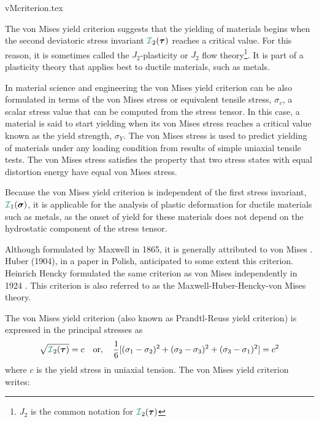 \begin{flushright} {\tiny {\color{gray} vMcriterion.tex}} \end{flushright}

The von Mises yield criterion suggests that the yielding of materials begins when the second 
deviatoric stress invariant ${\III}_2({\bm \tau})$ reaches a critical value. 
For this reason, it is sometimes called the $J_2$-plasticity or $J_2$ flow 
theory\footnote{$J_2$ is the common notation for ${\III}_2({\bm \tau})$}. 
It is part of a plasticity theory that applies best to ductile materials, such as metals. 

In material science and engineering the von Mises yield criterion can be also formulated in terms of 
the von Mises stress or equivalent tensile stress, $\sigma_v$, a scalar stress value that can be computed 
from the stress tensor. In this case, a material is said to start yielding when its von Mises stress 
reaches a critical value known as the yield strength, $\sigma_Y$. The von Mises stress is used to predict 
yielding of materials under any loading condition from results of simple uniaxial tensile tests. The 
von Mises stress satisfies the property that two stress states with equal distortion energy have equal 
von Mises stress. 

Because the von Mises yield criterion is independent of the first stress 
invariant, ${\III}_1({\bm \sigma})$, it is applicable 
for the analysis of plastic deformation for ductile materials such as metals, as the 
onset of yield for these materials does not depend on the hydrostatic component of the stress tensor. 

Although formulated by Maxwell in 1865, it is generally attributed to von Mises \cite{vonm13}. 
Huber (1904), in a paper in Polish, anticipated to some extent this criterion. 
Heinrich Hencky formulated the same criterion as von Mises independently in 1924 \cite{henc24,tata03}.
This criterion is also referred to as the Maxwell-Huber-Hencky-von Mises theory. 

The von Mises yield criterion (also known as Prandtl-Reuss yield criterion) 
is expressed in the principal stresses as
\[
\sqrt{{\III}_2({\bm \tau})} = c \quad \text{or}, \quad 
\frac{1}{6}[(\sigma_1 - \sigma_2)^2 + (\sigma_2 - \sigma_3)^2 + (\sigma_3 - \sigma_1)^2] =  c^2 
\]
where $c$ is the yield stress in uniaxial tension.
The von Mises yield criterion writes:

